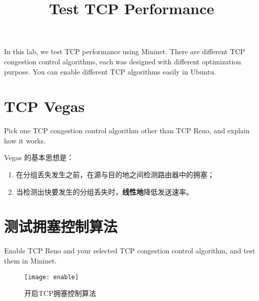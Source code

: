\endofdump
{}

    \title{Test TCP Performance}
    \maketitle
    \tableofcontents
    \vfill
    In this lab, we test TCP performance using Mininet. There are different TCP congestion control algorithms, each was designed with different optimization purpose. You can enable different TCP algorithms easily in Ubuntu.
    \vfill
    \clearpage
    \section{TCP Vegas}
    Pick one TCP congestion control algorithm other than TCP Reno, and explain how it works.

    Vegas 的基本思想是：
    \begin{enumerate}[(1)]
        \item 在分组丢失发生之前，在源与目的地之间检测路由器中的拥塞；
        \item 当检测出快要发生的分组丢失时，\textbf{线性地}降低发送速率。
    \end{enumerate}

    \section{测试拥塞控制算法}
    Enable TCP Reno and your selected TCP congestion control algorithm, and test them in Mininet.

    \begin{figure}[H]
        \centering
        \texttt{[image: enable]}
        \caption{开启TCP拥塞控制算法}\label{fig:enable}
    \end{figure}

